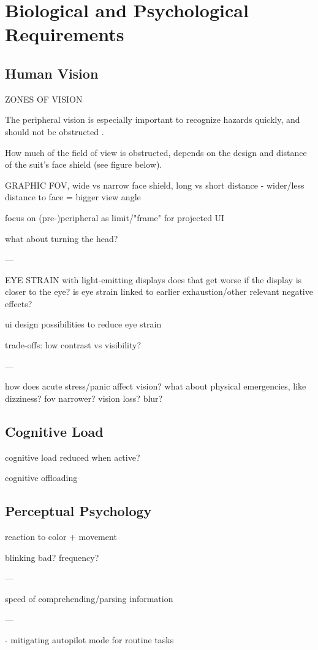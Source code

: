 \section{Biological and Psychological Requirements}

\subsection{Human Vision}

ZONES OF VISION

The peripheral vision is especially important to recognize hazards quickly, and should not be obstructed \parencite{}.

How much of the field of view is obstructed, depends on the design and distance of the suit's face shield (see figure below).

GRAPHIC FOV, wide vs narrow face shield, long vs short distance
- wider/less distance to face = bigger view angle

focus on (pre-)peripheral as limit/"frame" for projected UI

what about turning the head?

---

EYE STRAIN with light-emitting displays
does that get worse if the display is closer to the eye?
is eye strain linked to earlier exhaustion/other relevant negative effects?

ui design possibilities to reduce eye strain

trade-offs: low contrast vs visibility?

---

how does acute stress/panic affect vision? what about physical emergencies, like dizziness? fov narrower? vision loss? blur?

\subsection{Cognitive Load}

cognitive load reduced when active?

cognitive offloading

\subsection{Perceptual Psychology}

reaction to color + movement

blinking bad? frequency?

---

speed of comprehending/parsing information

---

- mitigating autopilot mode for routine tasks
